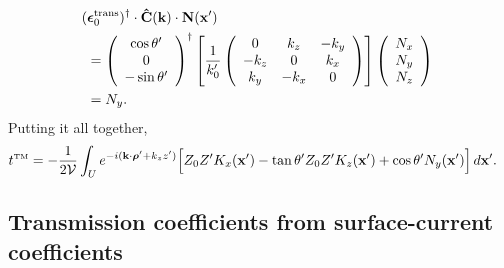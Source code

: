 \documentclass[letterpaper]{article}
\newcommand{\vbEps}{\boldsymbol{\epsilon}}
\begin{document}
\begin{align*}
&\hspace{-0.05in}
 (\vbEps_0\sups{trans})^\dagger \cdot
 \vbhat{C}(\vb k) \cdot \vb N(\vb x^\prime)
\\
&=
 \left(\begin{array}{c}\cos\theta^\prime \\ 0 \\-\sin\theta^\prime \end{array}\right)^\dagger
 \left[ \frac{1}{k_0^{\prime}}
        \left(\begin{array}{ccc}
               0       & k_z     & -k_y    \\
               -k_z    & 0       & k_x     \\
               k_y     & -k_x    & 0
              \end{array}
        \right)
 \right]
 \left(\begin{array}{c}N_x \\ N_y \\ N_z\end{array}\right)
\\
&=
 N_y.
\end{align*}
Putting it all together, 
\begin{align*}
 t^{\hbox{\tiny{TM}}}
&=-\frac{1}{2\mathcal{V}}
   \int_U e^{-i(\mathbf{k} \cdot \boldsymbol{\rho}^\prime + k_z z^\prime)}
        \Big[  Z_0 Z^\prime K_x(\mathbf{x}^\prime)
              -\tan\theta^\prime Z_0 Z^\prime K_z(\mathbf{x}^\prime)
              +\cos\theta^\prime N_y(\mathbf{x}^\prime)
        \Big] \, d\mathbf{x}^\prime.
\end{align*}


\subsection*{Transmission coefficients from surface-current coefficients}
\end{document}
